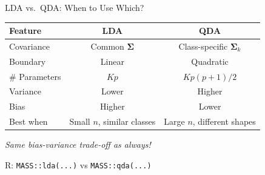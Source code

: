 \documentclass[aspectratio=169, 11pt]{beamer}
\begin{document}
\begin{frame}{LDA vs.\ QDA: When to Use Which?}

\begin{center}
\begin{tabular}{lcc}
\toprule
Feature & LDA & QDA \\
\midrule
Covariance & Common $\boldsymbol{\Sigma}$ & Class-specific $\boldsymbol{\Sigma}_k$ \\
Boundary & Linear & Quadratic \\
\# Parameters & $Kp$ & $Kp(p+1)/2$ \\
Variance & Lower & Higher \\
Bias & Higher & Lower \\
Best when & Small $n$, similar classes & Large $n$, different shapes \\
\bottomrule
\end{tabular}
\end{center}

\vspace{0.5em}
\centering
\textit{Same bias-variance trade-off as always!}

\vspace{0.3em}
R: \texttt{MASS::lda(...)} \quad vs \quad \texttt{MASS::qda(...)}
\end{frame}
\end{document}
